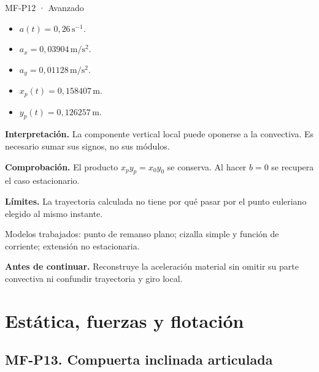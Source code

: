 \begin{studiumworked}{MF-P12 · Avanzado}
\begin{itemize}
\item $a(t)=0{,}26\,\mathrm{s^{-1}}$.

\item $a_x=0{,}03904\,\mathrm{m/s^2}$.

\item $a_y=0{,}01128\,\mathrm{m/s^2}$.

\item $x_p(t)=0{,}158407\,\mathrm{m}$.

\item $y_p(t)=0{,}126257\,\mathrm{m}$.

\end{itemize}

\textbf{Interpretación.} La componente vertical local puede oponerse a la convectiva. Es necesario sumar sus signos, no sus módulos.

\textbf{Comprobación.} El producto $x_py_p=x_0y_0$ se conserva. Al hacer $b=0$ se recupera el caso estacionario.

\textbf{Límites.} La trayectoria calculada no tiene por qué pasar por el punto euleriano elegido al mismo instante.

\end{studiumworked}



\begin{tcolorbox}[studiumcheck,breakable=false,title={Síntesis y comprobación}]Modelos trabajados: punto de remanso plano; cizalla simple y función de corriente; extensión no estacionaria.\par\textbf{Antes de continuar.} Reconstruye la aceleración material sin omitir su parte convectiva ni confundir trayectoria y giro local.\end{tcolorbox}

\chapter{Estática, fuerzas y flotación}


\Needspace{.30\textheight}\section{MF-P13. Compuerta inclinada articulada}

